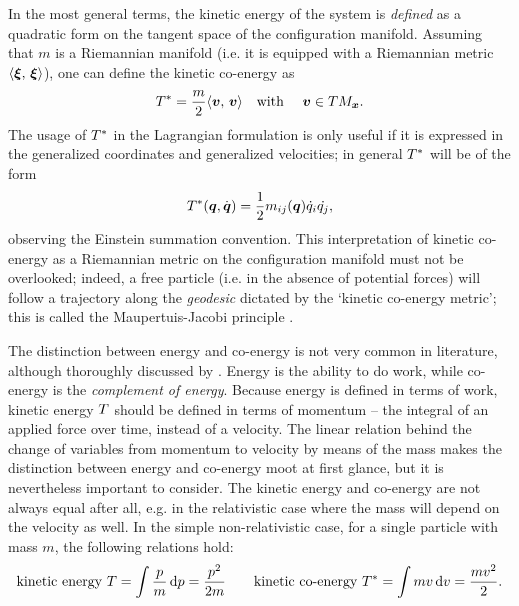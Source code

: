 In the most general terms, the kinetic energy of the system is \emph{defined} as a quadratic form on the tangent space of the configuration manifold. Assuming that $m$ is a Riemannian manifold (i.e. it is equipped with a Riemannian metric $\langle \vb*{\xi},\, \vb*{\xi}\rangle$), one can define the kinetic co-energy as
\begin{equation}
    \ecokin = \frac{m}{2}\inner{\vec{v}}{\vec{v}}\qq{with } \vec{v} \in TM_{\vec{x}}.
    \label{eq:ekin_mfld}
\end{equation}
The usage of $T^*$ in the Lagrangian formulation is only useful if it is expressed in the generalized coordinates and generalized velocities; in general $T^*$ will be of the form
\begin{equation}
    T^*(\vb*{q}, \dot{\vb*{q}}) = \frac{1}{2}m_{ij}(\vb*{q})\dot{q}_i\dot{q_j},
    \label{eq:kinetic_energy}
\end{equation}
observing the Einstein summation convention. This interpretation of kinetic co-energy as a Riemannian metric on the configuration manifold must not be overlooked; indeed, a free particle (i.e. in the absence of potential forces) will follow a trajectory along the \emph{geodesic} dictated by the `kinetic co-energy metric'; this is called the Maupertuis-Jacobi principle \cite{Arnold1989}.

The distinction between energy and co-energy is not very common in literature, although thoroughly discussed by \citet{Jeltsema2009}. Energy is the ability to do work, while co-energy is the \emph{complement of energy}. Because energy is defined in terms of work, kinetic energy $T$ should be defined in terms of momentum -- the integral of an applied force over time, instead of a velocity. The linear relation behind the change of variables from momentum to velocity by means of the mass makes the distinction between energy and co-energy moot at first glance, but it is nevertheless important to consider. The kinetic energy and co-energy are not always equal after all, e.g. in the relativistic case where the mass will depend on the velocity as well. In the simple non-relativistic case, for a single particle with mass $m$, the following relations hold:
$$ \text{kinetic energy } T = \int \frac{p}{m}\dd{p} = \frac{p^2}{2m}\qquad
   \text{kinetic co-energy } T^* = \int m v \dd{v} = \frac{mv^2}{2}.$$


